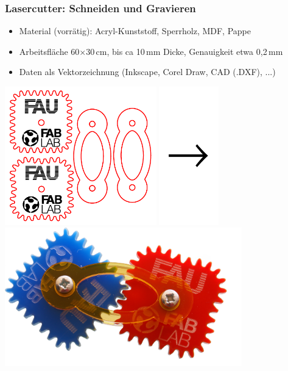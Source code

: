 \documentclass[t]{beamer}
\begin{document}
\begin{frame}
    \frametitle{Lasercutter: Schneiden und Gravieren}
    \begin{itemize}
        \item Material (vorrätig): Acryl-Kunststoff, Sperrholz, MDF, Pappe
        \item Arbeitsfläche 60$\times$30\,cm, bis ca 10\,mm Dicke, Genauigkeit etwa 0,2\,mm
        \item Daten als Vektorzeichnung (Inkscape, Corel Draw, CAD (.DXF), ...)
    \end{itemize}

    \bigskip

    \bigskip
    \begin{center}
        \includegraphics[height=6cm]{../img/SquareGears.pdf}
        \includegraphics[height=6cm]{../img/pfeil.pdf}
        \includegraphics[height=6cm]{../img/zahnraeder2b-skaliert.png}
    \end{center}

\end{frame}
\end{document}
